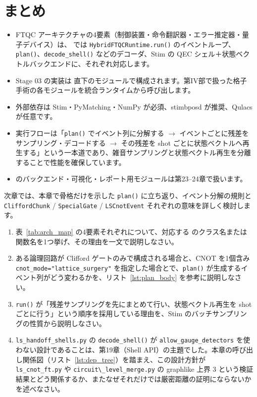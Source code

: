 \section{まとめ}\label{ch20:summary}

\begin{itemize}
  \item FTQC アーキテクチャの4要素（制御装置・命令翻訳器・エラー推定器・量子デバイス）は、 では \lstinline{HybridFTQCRuntime.run()} のイベントループ、\lstinline{plan()}、\lstinline{decode_shell()} などのデコーダ、Stim の QEC シェル＋状態ベクトルバックエンドに、それぞれ対応します。
  \item Stage 03 の実装は  直下のモジュールで構成されます。第IV部で扱った格子手術の各モジュールを統合ランタイムから呼び出します。
  \item 外部依存は Stim・PyMatching・NumPy が必須、stimbposd が推奨、Qulacs が任意です。
  \item 実行フローは「\lstinline{plan()} でイベント列に分解する $\to$ イベントごとに残差をサンプリング・デコードする $\to$ その残差を shot ごとに状態ベクトルへ再生する」という一本道であり、雑音サンプリングと状態ベクトル再生を分離することで性能を確保しています。
  \item {} のバックエンド・可視化・レポート用モジュールは第23–24章で扱います。
\end{itemize}

次章では、本章で骨格だけを示した \lstinline{plan()} に立ち返り、イベント分解の規則と \lstinline{CliffordChunk} / \lstinline{SpecialGate} / \lstinline{LSCnotEvent} それぞれの意味を詳しく検討します。

\begin{exercise}
  \begin{enumerate}
    \item 表~\ref{tab:arch_map} の4要素それぞれについて、対応する  のクラス名または関数名を1つ挙げ、その理由を一文で説明しなさい。
    \item ある論理回路が Clifford ゲートのみで構成される場合と、CNOT を1個含み \lstinline{cnot_mode="lattice_surgery"} を指定した場合とで、\lstinline{plan()} が生成するイベント列がどう変わるかを、リスト~\ref{lst:plan_body} を参考に説明しなさい。
    \item \lstinline{run()} が「残差サンプリングを先にまとめて行い、状態ベクトル再生を shot ごとに行う」という順序を採用している理由を、Stim のバッチサンプリングの性質から説明しなさい。
    \item \texttt{ls\_handoff\_shells.py} の \lstinline{decode_shell()} が \lstinline{allow_gauge_detectors} を使わない設計であることは、第19章（Shell API）の主題でした。本章の呼び出し関係図（リスト~\ref{lst:dep_tree}）を踏まえ、この設計方針が \lstinline{ls_cnot_ft.py} や \lstinline{circuit\_level_merge.py} の graphlike 上界 3 という検証結果とどう関係するか、またなぜそれだけでは厳密距離の証明にならないかを述べなさい。
  \end{enumerate}
\end{exercise}
